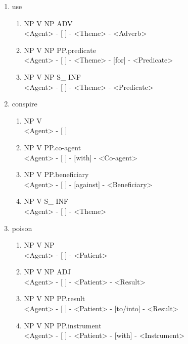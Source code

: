 \documentclass[11pt,a4paper,twocolumn]{article}
\begin{document}
		\begin{enumerate}
			\item use
				\begin{enumerate}
					\item NP V NP ADV\\
					<Agent> - [ ] - <Theme> - <Adverb>
					
					\item NP V NP PP.predicate\\
					<Agent> - [ ] - <Theme> - [for] - <Predicate>
					
					\item NP V NP S\_ INF\\
					<Agent> - [ ] - <Theme> - <Predicate>
					
				\end{enumerate}						
		
			\item conspire
				\begin{enumerate}
					\item NP V\\
					<Agent> - [ ]\\
					
					\item NP V PP.co-agent\\
					<Agent> - [ ] - [with] - <Co-agent>
					
					\item NP V PP.beneficiary\\
					<Agent> - [ ] - [against] - <Beneficiary>
					
					\item NP V S\_ INF\\
					<Agent> - [ ] - <Theme>
				\end{enumerate}
				
			\item poison
				\begin{enumerate}
					\item NP V NP\\
					<Agent> - [ ] - <Patient>
					
					\item NP V NP ADJ\\
					<Agent> - [ ] - <Patient> - <Result>
					
					\item NP V NP PP.result\\
					<Agent> - [ ] - <Patient> - [to/into] - <Result>
					
					\item NP V NP PP.instrument\\
					<Agent> - [ ] - <Patient> - [with] - <Instrument>
					

\end{enumerate}
\end{enumerate}
\end{document}

